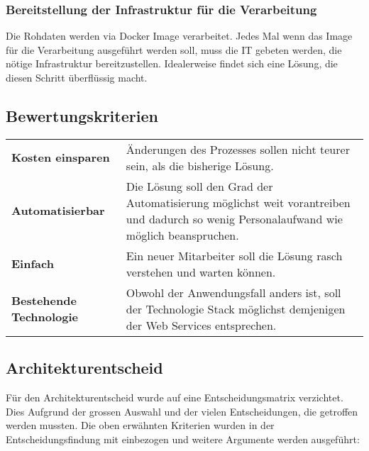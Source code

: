 \subsubsection{Bereitstellung der Infrastruktur für die Verarbeitung}
Die Rohdaten werden via Docker Image verarbeitet. Jedes Mal wenn das Image für die Verarbeitung ausgeführt werden soll, muss die IT gebeten werden, die nötige Infrastruktur bereitzustellen. Idealerweise findet sich eine Lösung, die diesen Schritt überflüssig macht.


\subsection{Bewertungskriterien}
\begin{tabular}{p{}p{}}
    \textbf{Kosten einsparen} & Änderungen des Prozesses sollen nicht teurer sein, als die bisherige Lösung.\\
    \textbf{Automatisierbar} & Die Lösung soll den Grad der Automatisierung möglichst weit vorantreiben und dadurch so wenig Personalaufwand wie möglich beanspruchen.\\
    \textbf{Einfach} & Ein neuer Mitarbeiter soll die Lösung rasch verstehen und warten können.\\
    \textbf{Bestehende Technologie} & Obwohl der Anwendungsfall anders ist, soll der Technologie Stack möglichst demjenigen der Web Services entsprechen.\\
\end{tabular}

\subsection{Architekturentscheid}
Für den Architekturentscheid wurde auf eine Entscheidungsmatrix verzichtet. Dies Aufgrund der grossen Auswahl und der vielen Entscheidungen, die getroffen werden mussten. Die oben erwähnten Kriterien wurden in der Entscheidungsfindung mit einbezogen und weitere Argumente werden ausgeführt:

